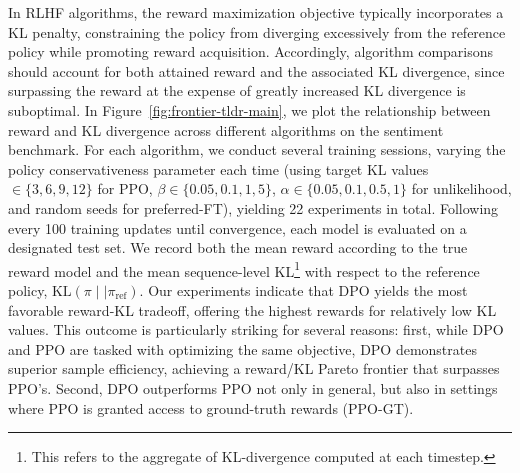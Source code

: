 In RLHF algorithms, the reward maximization objective typically incorporates a KL penalty, constraining the policy from diverging excessively from the reference policy while promoting reward acquisition. Accordingly, algorithm comparisons should account for both attained reward and the associated KL divergence, since surpassing the reward at the expense of greatly increased KL divergence is suboptimal. In Figure~\ref{fig:frontier-tldr-main}, we plot the relationship between reward and KL divergence across different algorithms on the sentiment benchmark. For each algorithm, we conduct several training sessions, varying the policy conservativeness parameter each time (using target KL values $\in\{3,6,9,12\}$ for PPO, $\beta \in \{0.05,0.1,1,5\}$, $\alpha\in\{0.05,0.1,0.5,1\}$ for unlikelihood, and random seeds for preferred-FT), yielding 22 experiments in total. Following every 100 training updates until convergence, each model is evaluated on a designated test set. We record both the mean reward according to the true reward model and the mean sequence-level KL\footnote{This refers to the aggregate of KL-divergence computed at each timestep.} with respect to the reference policy, $\text{KL}\left(\pi\mid \mid \pi_\text{ref}\right)$. Our experiments indicate that DPO yields the most favorable reward-KL tradeoff, offering the highest rewards for relatively low KL values. This outcome is particularly striking for several reasons: first, while DPO and PPO are tasked with optimizing the same objective, DPO demonstrates superior sample efficiency, achieving a reward/KL Pareto frontier that surpasses PPO's. Second, DPO outperforms PPO not only in general, but also in settings where PPO is granted access to ground-truth rewards (PPO-GT).


